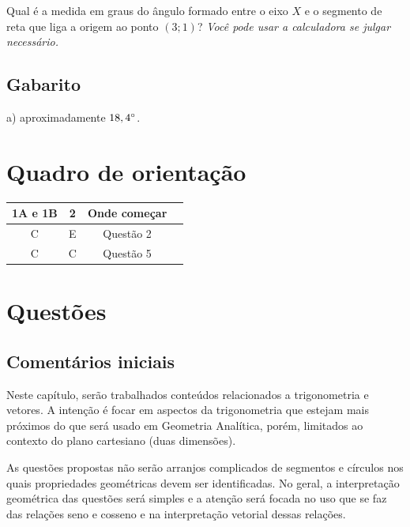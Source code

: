 \documentclass[main.tex]{subfiles}
\begin{document}
\begin{diagnostico}
Qual é a medida em graus do ângulo formado entre o eixo $X$ e o segmento de reta que liga a origem ao ponto $(3;1)$? \textit{Você pode usar a calculadora se julgar necessário.}
\end{diagnostico}

\paraTutores

\subsection{Gabarito}

a) aproximadamente $18,4\degree$.

\section{Quadro de orientação}

\begin{center}
 \begin{tabular}{|c c c |c|} 
 \hline
 1A e 1B & 2 & Onde começar\\
 \hline
 C & E & Questão 2 \\ 
 \hline
 C & C & Questão 5 \\ 
 \hline
\end{tabular}
\end{center}

\paraAmbos

\newpage

\section{Questões}

\paraTutores

\subsection{Comentários iniciais}

Neste capítulo, serão trabalhados conteúdos relacionados a trigonometria e vetores. A intenção é focar em aspectos da trigonometria que estejam mais próximos do que será usado em Geometria Analítica, porém, limitados ao contexto do plano cartesiano (duas dimensões).

As questões propostas não serão arranjos complicados de segmentos e círculos nos quais propriedades geométricas devem ser identificadas. No geral, a interpretação geométrica das questões será simples e a atenção será focada no uso que se faz das relações seno e cosseno e na interpretação vetorial dessas relações.
\end{document}
